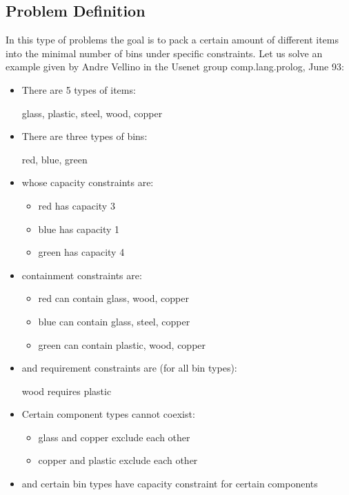 \subsection{Problem Definition}
In this type of problems the goal is to pack a certain amount of
different items into the minimal number of bins under specific constraints.
Let us solve an example given by Andre Vellino in the Usenet
group comp.lang.prolog, June 93:
\begin{itemize}
\item There are 5 types of items:

        glass, plastic, steel, wood, copper

\item There are three types of bins:

        red, blue, green

\item        whose capacity constraints are:

\begin{itemize}
\item        red   has capacity 3
\item        blue  has capacity 1
\item 	     green has capacity 4
\end{itemize}

\item containment constraints are:
\begin{itemize}
\item        red   can contain glass, wood, copper
\item        blue  can contain glass, steel, copper
\item        green can contain plastic, wood, copper
\end{itemize}

\item and requirement constraints are (for all bin types):

        wood requires plastic

\item Certain component types cannot coexist:

\begin{itemize}
\item        glass and copper exclude each other
\item        copper and plastic exclude each other
\end{itemize}

\item and certain bin types have capacity constraint for certain
components


\end{itemize}
